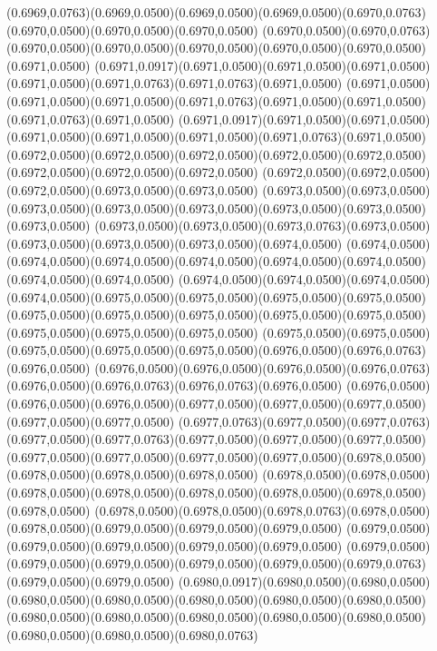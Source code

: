 (0.6969,0.0763)(0.6969,0.0500)(0.6969,0.0500)(0.6969,0.0500)(0.6970,0.0763)(0.6970,0.0500)(0.6970,0.0500)(0.6970,0.0500)
(0.6970,0.0500)(0.6970,0.0763)(0.6970,0.0500)(0.6970,0.0500)(0.6970,0.0500)(0.6970,0.0500)(0.6970,0.0500)(0.6971,0.0500)
(0.6971,0.0917)(0.6971,0.0500)(0.6971,0.0500)(0.6971,0.0500)(0.6971,0.0500)(0.6971,0.0763)(0.6971,0.0763)(0.6971,0.0500)
(0.6971,0.0500)(0.6971,0.0500)(0.6971,0.0500)(0.6971,0.0763)(0.6971,0.0500)(0.6971,0.0500)(0.6971,0.0763)(0.6971,0.0500)
(0.6971,0.0917)(0.6971,0.0500)(0.6971,0.0500)(0.6971,0.0500)(0.6971,0.0500)(0.6971,0.0500)(0.6971,0.0763)(0.6971,0.0500)
(0.6972,0.0500)(0.6972,0.0500)(0.6972,0.0500)(0.6972,0.0500)(0.6972,0.0500)(0.6972,0.0500)(0.6972,0.0500)(0.6972,0.0500)
(0.6972,0.0500)(0.6972,0.0500)(0.6972,0.0500)(0.6973,0.0500)(0.6973,0.0500)
\PST@Solid(0.6973,0.0500)(0.6973,0.0500)(0.6973,0.0500)(0.6973,0.0500)(0.6973,0.0500)(0.6973,0.0500)(0.6973,0.0500)(0.6973,0.0500)
(0.6973,0.0500)(0.6973,0.0500)(0.6973,0.0763)(0.6973,0.0500)(0.6973,0.0500)(0.6973,0.0500)(0.6973,0.0500)(0.6974,0.0500)
(0.6974,0.0500)(0.6974,0.0500)(0.6974,0.0500)(0.6974,0.0500)(0.6974,0.0500)(0.6974,0.0500)(0.6974,0.0500)(0.6974,0.0500)
(0.6974,0.0500)(0.6974,0.0500)(0.6974,0.0500)(0.6974,0.0500)(0.6975,0.0500)(0.6975,0.0500)(0.6975,0.0500)(0.6975,0.0500)
(0.6975,0.0500)(0.6975,0.0500)(0.6975,0.0500)(0.6975,0.0500)(0.6975,0.0500)(0.6975,0.0500)(0.6975,0.0500)(0.6975,0.0500)
(0.6975,0.0500)(0.6975,0.0500)(0.6975,0.0500)(0.6975,0.0500)(0.6975,0.0500)(0.6976,0.0500)(0.6976,0.0763)(0.6976,0.0500)
(0.6976,0.0500)(0.6976,0.0500)(0.6976,0.0500)(0.6976,0.0763)(0.6976,0.0500)(0.6976,0.0763)(0.6976,0.0763)(0.6976,0.0500)
(0.6976,0.0500)(0.6976,0.0500)(0.6976,0.0500)(0.6977,0.0500)(0.6977,0.0500)(0.6977,0.0500)(0.6977,0.0500)(0.6977,0.0500)
(0.6977,0.0763)(0.6977,0.0500)(0.6977,0.0763)(0.6977,0.0500)(0.6977,0.0763)(0.6977,0.0500)(0.6977,0.0500)(0.6977,0.0500)
(0.6977,0.0500)(0.6977,0.0500)(0.6977,0.0500)(0.6977,0.0500)(0.6978,0.0500)(0.6978,0.0500)(0.6978,0.0500)(0.6978,0.0500)
(0.6978,0.0500)(0.6978,0.0500)(0.6978,0.0500)(0.6978,0.0500)(0.6978,0.0500)(0.6978,0.0500)(0.6978,0.0500)(0.6978,0.0500)
(0.6978,0.0500)(0.6978,0.0500)(0.6978,0.0763)(0.6978,0.0500)(0.6978,0.0500)(0.6979,0.0500)(0.6979,0.0500)(0.6979,0.0500)
(0.6979,0.0500)(0.6979,0.0500)(0.6979,0.0500)(0.6979,0.0500)(0.6979,0.0500)
\PST@Solid(0.6979,0.0500)(0.6979,0.0500)(0.6979,0.0500)(0.6979,0.0500)(0.6979,0.0500)(0.6979,0.0763)(0.6979,0.0500)(0.6979,0.0500)
(0.6980,0.0917)(0.6980,0.0500)(0.6980,0.0500)(0.6980,0.0500)(0.6980,0.0500)(0.6980,0.0500)(0.6980,0.0500)(0.6980,0.0500)
(0.6980,0.0500)(0.6980,0.0500)(0.6980,0.0500)(0.6980,0.0500)(0.6980,0.0500)(0.6980,0.0500)(0.6980,0.0500)(0.6980,0.0763)

